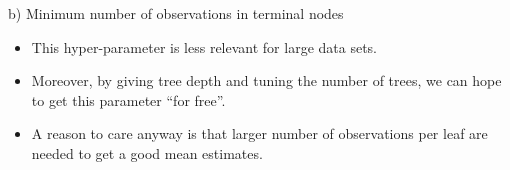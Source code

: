 \documentclass[
  10pt,
  ignorenonframetext,
]{beamer}
\providecommand{\tightlist}{%
  \setlength{\itemsep}{0pt}\setlength{\parskip}{0pt}}
\begin{document}
\begin{frame}
\begin{block}{b) Minimum number of observations in terminal nodes}
\protect\hypertarget{b-minimum-number-of-observations-in-terminal-nodes}{}
\(~\)

\begin{itemize}
\tightlist
\item
  This hyper-parameter is less relevant for large data sets.
\end{itemize}

\vspace{2mm}

\begin{itemize}
\tightlist
\item
  Moreover, by giving tree depth and tuning the number of trees, we can
  hope to get this parameter ``for free''.
\end{itemize}

\vspace{2mm}

\begin{itemize}
\tightlist
\item
  A reason to care anyway is that larger number of observations per leaf
  are needed to get a good mean estimates.
\end{itemize}

\(~\)

\(~\)
\end{block}
\end{frame}
\end{document}
